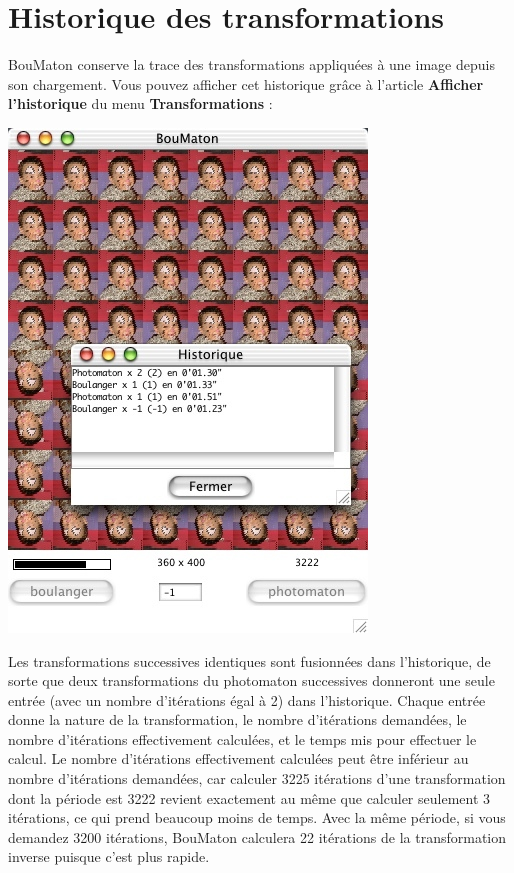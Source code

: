 \documentclass[a4paper]{article}
\newcommand{\BouMaton}{\textsf{BouMaton}\xspace}
\newcommand{\menu}[1]{\textsf{\textbf{#1}}}
\begin{document}
  \section{Historique des transformations}
  \BouMaton conserve la trace des transformations appliquées à une 
  image depuis son chargement. Vous pouvez afficher cet historique 
  grâce à l'article \menu{Afficher l'historique} du menu 
  \menu{Transformations} :
  \begin{center}
    \includegraphics[scale=0.4]{history_fr}
  \end{center}
  Les transformations successives identiques sont fusionnées dans 
  l'historique, de sorte que deux transformations du photomaton 
  successives donneront une seule entrée (avec un nombre d'itérations 
  égal à 2) dans l'historique. Chaque entrée donne la nature de la 
  transformation, le nombre d'itérations demandées, le nombre 
  d'itérations effectivement calculées, et le temps mis pour effectuer 
  le calcul. Le nombre d'itérations effectivement calculées peut être 
  inférieur au nombre d'itérations demandées, car calculer 3225 
  itérations d'une transformation dont la période est 3222 revient 
  exactement au même que calculer seulement 3 itérations, ce qui prend 
  beaucoup moins de temps. Avec la même période, si vous demandez 3200 
  itérations, \BouMaton calculera 22 itérations de la transformation 
  inverse puisque c'est plus rapide.
\end{document}
